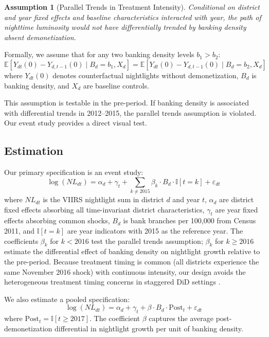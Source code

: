 \documentclass[12pt]{article}
\newtheorem{assumption}{Assumption}
\newcommand{\E}{\mathbb{E}}
\newcommand{\ind}{\mathbb{I}}
\begin{document}
\begin{assumption}[Parallel Trends in Treatment Intensity]
Conditional on district and year fixed effects and baseline characteristics interacted with year, the path of nighttime luminosity would not have differentially trended by banking density absent demonetization.
\end{assumption}

Formally, we assume that for any two banking density levels $b_1 > b_2$:
\begin{equation}
\E[Y_{dt}(0) - Y_{d,t-1}(0) \mid B_d = b_1, X_d] = \E[Y_{dt}(0) - Y_{d,t-1}(0) \mid B_d = b_2, X_d]
\end{equation}
where $Y_{dt}(0)$ denotes counterfactual nightlights without demonetization, $B_d$ is banking density, and $X_d$ are baseline controls.

This assumption is testable in the pre-period. If banking density is associated with differential trends in 2012--2015, the parallel trends assumption is violated. Our event study provides a direct visual test.

\subsection{Estimation}

Our primary specification is an event study:
\begin{equation}\label{eq:event_study}
\log(NL_{dt}) = \alpha_d + \gamma_t + \sum_{k \neq 2015} \beta_k \cdot B_d \cdot \ind[t = k] + \varepsilon_{dt}
\end{equation}
where $NL_{dt}$ is the VIIRS nightlight sum in district $d$ and year $t$, $\alpha_d$ are district fixed effects absorbing all time-invariant district characteristics, $\gamma_t$ are year fixed effects absorbing common shocks, $B_d$ is bank branches per 100,000 from Census 2011, and $\ind[t = k]$ are year indicators with 2015 as the reference year. The coefficients $\beta_k$ for $k < 2016$ test the parallel trends assumption; $\beta_k$ for $k \geq 2016$ estimate the differential effect of banking density on nightlight growth relative to the pre-period. Because treatment timing is common (all districts experience the same November 2016 shock) with continuous intensity, our design avoids the heterogeneous treatment timing concerns in staggered DiD settings \citep{sun2021estimating}.

We also estimate a pooled specification:
\begin{equation}\label{eq:pooled}
\log(NL_{dt}) = \alpha_d + \gamma_t + \beta \cdot B_d \cdot \text{Post}_t + \varepsilon_{dt}
\end{equation}
where $\text{Post}_t = \ind[t \geq 2017]$. The coefficient $\beta$ captures the average post-demonetization differential in nightlight growth per unit of banking density.
\end{document}
